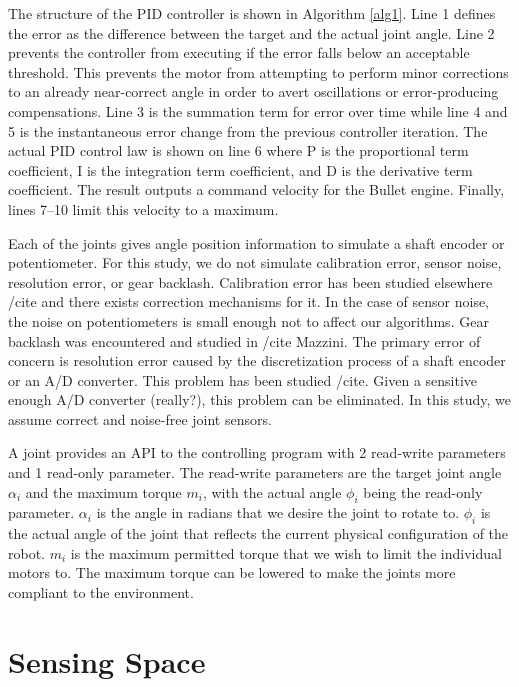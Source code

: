 The structure of the PID controller is shown in Algorithm \autoref{alg1}. Line 1 defines the error as the difference between the target and the actual joint angle. Line 2 prevents the controller from executing if the error falls below an acceptable threshold. This prevents the motor from attempting to perform minor corrections to an already near-correct angle in order to avert oscillations or error-producing compensations. Line 3 is the summation term for error over time while line 4 and 5 is the instantaneous error change from the previous controller iteration. The actual PID control law is shown on line 6 where P is the proportional term coefficient, I is the integration term coefficient, and D is the derivative term coefficient. The result outputs a command velocity for the Bullet engine. Finally, lines 7--10 limit this velocity to a maximum.

Each of the joints gives angle position information to simulate a shaft encoder or potentiometer. For this study, we do not simulate calibration error, sensor noise, resolution error, or gear backlash. Calibration error has been studied elsewhere \slash cite and there exists correction mechanisms for it. In the case of sensor noise, the noise on potentiometers is small enough not to affect our algorithms. Gear backlash was encountered and studied in \slash cite Mazzini. The primary error of concern is resolution error caused by the discretization process of a shaft encoder or an A\slash D converter. This problem has been studied \slash cite. Given a sensitive enough A\slash D converter (really?), this problem can be eliminated. In this study, we assume correct and noise-free joint sensors.

A joint provides an API to the controlling program with 2 read-write parameters and 1 read-only parameter. The read-write parameters are the target joint angle $\alpha_i$ and the maximum torque $m_i$, with the actual angle $\phi_i$ being the read-only parameter. $\alpha_i$ is the angle in radians that we desire the joint to rotate to. $\phi_i$ is the actual angle of the joint that reflects the current physical configuration of the robot. $m_i$ is the maximum permitted torque that we wish to limit the individual motors to. The maximum torque can be lowered to make the joints more compliant to the environment.

\pagebreak 

\chapter{Sensing Space}
\label{chap:sensing}

